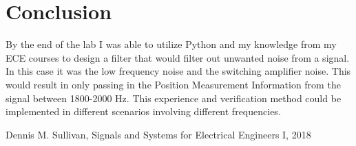 \documentclass[12pt]{report}
\begin{document}
\section{Conclusion}

By the end of the lab I was able to utilize Python and my knowledge from my ECE courses to design a filter that would filter out unwanted noise from a signal. In this case it was the low frequency noise and the switching amplifier noise. This would result in only passing in the Position Measurement Information from the signal between 1800-2000 Hz. This experience and verification method could be implemented in different scenarios involving different frequencies.
\newpage


\begin{thebibliography}{111}
Dennis M. Sullivan,
Signals and Systems for Electrical Engineers I,
 2018
\end{thebibliography}
\end{document}
